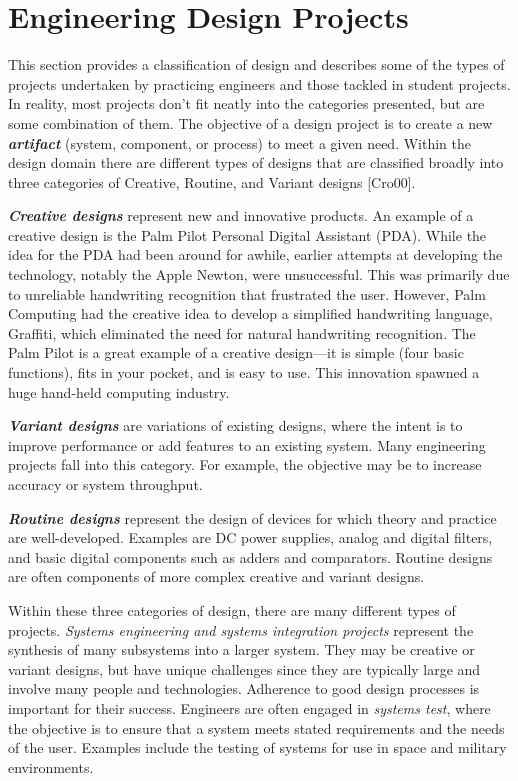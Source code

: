 \section{Engineering Design Projects}
\label{section:engineering-design-projects}

This section provides a classification of design and describes some of
the types of projects undertaken by practicing engineers and those
tackled in student projects. In reality, most projects don't fit neatly
into the categories presented, but are some combination of them. The
objective of a design project is to create a new
\emph{\textbf{artifact}} (system, component, or process) to meet a given
need. Within the design domain there are different types of designs that
are classified broadly into three categories of Creative, Routine, and
Variant designs {[}Cro00{]}.

\emph{\textbf{Creative designs}} represent new and innovative products.
An example of a creative design is the Palm Pilot Personal Digital
Assistant (PDA). While the idea for the PDA had been around for awhile,
earlier attempts at developing the technology, notably the Apple Newton,
were unsuccessful. This was primarily due to unreliable handwriting
recognition that frustrated the user. However, Palm Computing had the
creative idea to develop a simplified handwriting language, Graffiti,
which eliminated the need for natural handwriting recognition. The Palm
Pilot is a great example of a creative design---it is simple (four basic
functions), fits in your pocket, and is easy to use. This innovation
spawned a huge hand-held computing industry.

\emph{\textbf{Variant designs}} are variations of existing designs,
where the intent is to improve performance or add features to an
existing system. Many engineering projects fall into this category. For
example, the objective may be to increase accuracy or system throughput.

\emph{\textbf{Routine designs}} represent the design of devices for
which theory and practice are well-developed. Examples are DC power
supplies, analog and digital filters, and basic digital components such
as adders and comparators. Routine designs are often components of more
complex creative and variant designs.

Within these three categories of design, there are many different types
of projects. \emph{Systems engineering and systems integration projects}
represent the synthesis of many subsystems into a larger system. They
may be creative or variant designs, but have unique challenges since
they are typically large and involve many people and technologies.
Adherence to good design processes is important for their success.
Engineers are often engaged in \emph{systems test}, where the objective
is to ensure that a system meets stated requirements and the needs of
the user. Examples include the testing of systems for use in space and
military environments.

